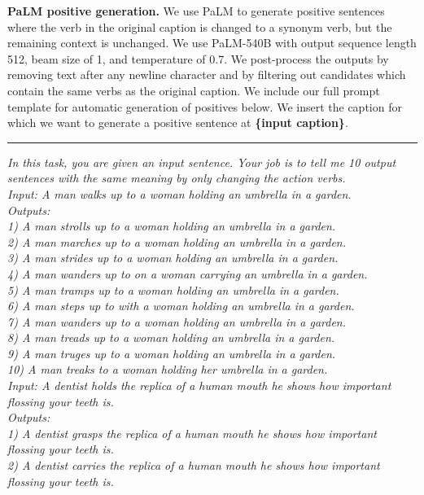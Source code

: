 \noindent\textbf{PaLM positive generation.} We use PaLM to generate positive sentences where the verb in the original caption is changed to a synonym verb, but the remaining context is unchanged. We use PaLM-540B with output sequence length 512, beam size of 1, and temperature of 0.7. We post-process the outputs by removing text after any newline character and by filtering out candidates which contain the same verbs as the original caption. We include our full prompt template for automatic generation of positives below. We insert the caption for which we want to generate a positive sentence at \textbf{\{input caption\}}. \\
\noindent\rule{8.5cm}{0.4pt}
\textit{In this task, you are given an input sentence. Your job is to tell me 10 output sentences with the same meaning by only changing the action verbs. \\
Input: A man walks up to a woman holding an umbrella in a garden. \\
Outputs: \\
 1) A man strolls up to a woman holding an umbrella in a garden.  \\
 2) A man marches up to a woman holding an umbrella in a garden.  \\
 3) A man strides up to a woman holding an umbrella in a garden. \\ 
 4) A man wanders up to on a woman carrying an umbrella in a garden. \\
 5) A man tramps up to a woman holding an umbrella in a garden. \\
 6) A man steps up to with a woman holding an umbrella in a garden. \\
 7) A man wanders up to a woman holding an umbrella in a garden. \\ 
 8) A man treads up to a woman holding an umbrella in a garden. \\
 9) A man truges up to a woman holding an umbrella in a garden. \\
 10) A man treaks to a woman holding her umbrella in a garden. \\
Input: A dentist holds the replica of a human mouth he shows how important flossing your teeth is. \\
Outputs: \\ 
1) A dentist grasps the replica of a human mouth he shows how important flossing your teeth is. \\
2) A dentist carries the replica of a human mouth he shows how important flossing your teeth is. \\
}
